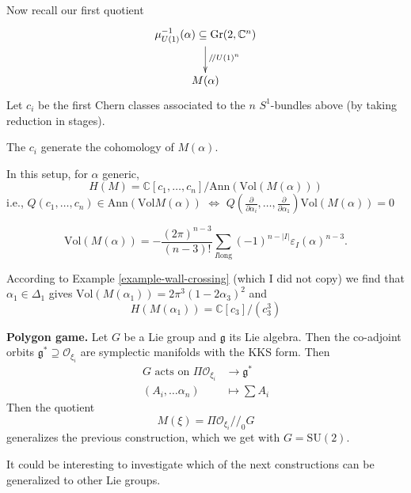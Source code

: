 \medskip\noindent
Now recall our first quotient
$$
\xymatrix{
\mu_{U(1)}^{-1}(\alpha)\subseteq
\text{Gr}(2,\mathbb{C}^n)
\ar[d]^{/\!/U(1)^n}\\
M(\alpha)
}
$$
Let $c_i$ be the first Chern
classes associated to the
$n$ $S^1$-bundles above
(by taking reduction in stages).

\begin{theorem}
\label{theorem-Haussmann-Knutson-M}
The $c_i$ generate the cohomology of
$M(\alpha)$.
\end{theorem}

\begin{theorem}
\label{theorem-Guillemin-Stenberg}
In this setup, for $\alpha$ generic,
$$
H(M)=\mathbb{C}[c_1,\ldots,c_n]/\text{Ann}
(\text{Vol}(M(\alpha)))
$$
i.e., $Q(c_1,\ldots,c_n) \in
\text{Ann}(\text{Vol}M(\alpha))$
$\iff$ $Q\left(\frac{\partial }{\partial
\alpha_i},\ldots,
\frac{\partial }{\partial \alpha_1}\right)
\text{Vol}(M(\alpha))=0$
\end{theorem}

\begin{theorem}
\label{theorem-Takakura-The-Koi}
$$
\text{Vol}(M(\alpha))
=-\frac{(2\pi)^{n-3}}{(n-3)!}
\sum_{I\text{
long}}(-1)^{n-|I|}\varepsilon_I(\alpha)^{n-3}
.
$$
\end{theorem}

\begin{example}
\label{example-Delta1}
According to Example
\ref{example-wall-crossing} (which I
did not copy) we find that
$\alpha_1 \in \Delta_1$ gives
$\text{Vol}(M(\alpha_1))=2\pi^3(1-2\alpha_3)
^2$
and
$$
H(M(\alpha_1))=\mathbb{C}[c_3]/(c_3^3)
$$
\end{example}

\medskip\noindent
{\bf Polygon game.}
Let $G$ be a Lie group and $\mathfrak{g}$ its
Lie algebra.
Then the co-adjoint orbits
$\mathfrak{g}^*  \supseteq
\mathcal{O}_{\xi_i}$
are symplectic manifolds with the KKS form.
Then
$$
\begin{aligned}
G\text{ acts on }\Pi \mathcal{O}_{\xi_i}
&\longrightarrow \mathfrak{g}^* \\
(A_i,\ldots\alpha_n) &\longmapsto \sum A_i
\end{aligned}
$$
Then the quotient
$$
M(\xi)=\Pi \mathcal{O}_{\xi_i}/\!/_0 G
$$
generalizes the previous construction,
which we get with $G=\text{SU}(2)$.

It could be interesting to investigate
which of the next constructions can be
generalized
to other Lie groups.

